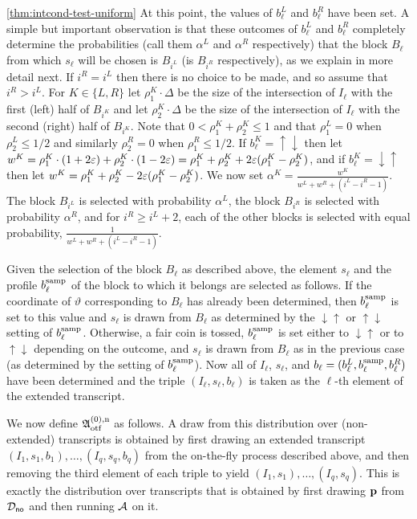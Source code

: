 \begin{proofof}{\cref{thm:intcond-test-uniform}}
At this point, the values of $b^L_\ell$ and $b^R_\ell$ have been set.
A simple but important observation is that
these outcomes of $b^L_\ell$ and $b^R_\ell$ completely determine the
probabilities (call them $\alpha^L$ and $\alpha^R$ respectively)
that the block $B_\ell$ from which $s_\ell$ will be chosen is $B_{i^L}$ (is $B_{i^R}$
respectively), as we explain in more detail next. If $i^R=i^L$ then there is no
choice to be made, and so assume that $i^R>i^L$. For $K\in \{L,R\}$ let
$\rho^K_1\cdot \Delta$ be the size of the intersection of $I_\ell$ with the
first (left) half of $B_{i^K}$ and let $\rho^K_2\cdot \Delta$ be the size of the intersection of $I_\ell$ with the second (right) half of $B_{i^K}$. Note that $0 < \rho^K_1+\rho^K_2 \leq 1$
and that $\rho^L_1=0$ when $\rho^L_2 \leq 1/2$ and similarly $\rho^R_2=0$ when $\rho^R_1 \leq 1/2$. If $b^K_\ell = \uparrow\downarrow$
then let $w^K = \rho^K_1\cdot(1+2\varepsilon) + \rho^K_2\cdot(1-2\varepsilon)
  = \rho^K_1+\rho^K_2 + 2\varepsilon(\rho^K_1-\rho^K_2)$, and if
  $b^K_\ell = \downarrow\uparrow$
then let $w^K =  \rho^K_1+\rho^K_2 - 2\varepsilon(\rho^K_1-\rho^K_2)$.
We now set $\alpha^K = \frac{w^K}{w^L+w^R + (i^L-i^R-1)}$.
The block $B_{i^L}$ is selected with probability $\alpha^L$, the block
$B_{i^R}$ is selected with probability $\alpha^R$, and for $i^R \geq i^L+2$, each
of the other blocks is selected with equal probability, $\frac{1}{w^L+w^R + (i^L-i^R-1)}$.



Given the selection of
the block $B_\ell$ as described above, the element $s_\ell$ and the profile
$b^{\rm samp}_\ell$ of the block to which it belongs are selected as follows.
If the coordinate of $\vartheta$ corresponding to $B_{\ell}$ has already been
determined, then $b^{\rm samp}_\ell$ is set to this value
and $s_{\ell}$ is drawn from $B_\ell$
as determined by the $\downarrow \uparrow$ or $\uparrow \downarrow$ setting
of $b^{\rm samp}_\ell$.  Otherwise, a fair coin is tossed, $b^{\rm samp}_\ell$
is set either to $\downarrow \uparrow$ or to $\uparrow \downarrow$ depending
on the outcome, and $s_\ell$ is drawn from $B_\ell$ as in the previous case
(as determined by the setting of $b^{\rm samp}_\ell$).
Now all of $I_\ell$, $s_\ell$, and $b_\ell=(b^L_\ell,b^{\rm samp}_\ell,b^R_\ell)$
have been determined and
the triple $(I_\ell,s_\ell,b_\ell)$ is taken as the
$\ell$-th element of the extended transcript.

We now define $\mathfrak{A}^{(0),\rm n}_{\rm otf}$ as follows.
A draw from this distribution over
(non-extended) transcripts is obtained by first drawing an
extended transcript $(I_1,s_1,b_1),\dots,(I_q,s_q,b_q)$ from the
on-the-fly process described above, and then removing the third element
of each triple to yield $(I_1,s_1),\dots,(I_q,s_q).$  This is exactly
the distribution over transcripts that is obtained by first drawing $\mathbf{p}$
from $\mathcal{D}_{\textsf{no}}$ and then running $\mathcal{A}$ on it.



\end{proofof}
